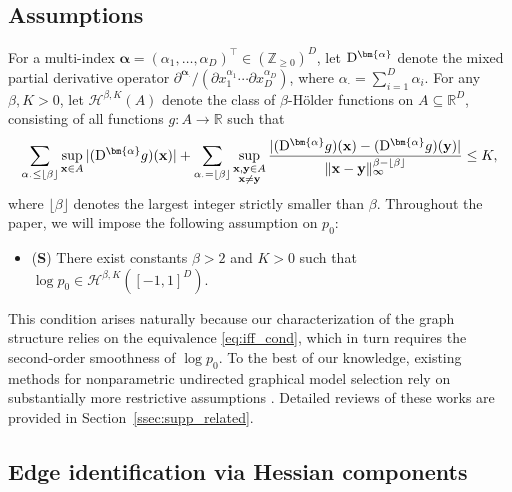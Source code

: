 \documentclass[11pt,a4paper,final]{article}
\numberwithin{equation}{section}
\theoremstyle{remark}
\def\cH{\mathcal H}
\newcommand{\bS}{{\bf S}}
\newcommand{\bx}{{\bf x}}
\newcommand{\by}{{\bf y}}
\newcommand{\bbR}{{\mathbb R}}
\newcommand{\bbZ}{{\mathbb Z}}
\newcommand{\balpha}{\bm{\alpha}}
\newcommand{\Holder}{H\"{o}lder}
\newcommand{\bean}{\setlength\arraycolsep{1pt}\begin{eqnarray*}}
\newcommand{\eean}{\end{eqnarray*}}
\newcommand{\bed}{\begin{itemize}}
\newcommand{\eed}{\end{itemize}}
\def\D{{\rm D}}
\begin{document}
\subsection{Assumptions}
\label{ssec:assm}

For a multi-index $\balpha = (\alpha_1,\ldots,\alpha_D)^{\top} \in (\bbZ_{\geq 0})^{D}$, let $\D^{\balpha}$ denote the mixed partial derivative operator $\partial^{\balpha_{\cdot}} / ( \partial x_1^{\alpha_1} \cdots \partial x_{D}^{\alpha_D})$, where $\alpha{_{\cdot}} = \sum_{i=1}^{D} \alpha_i$.
For any $\beta, K > 0$, let $\cH^{\beta, K}(A)$ denote the class of $\beta$-H\"older functions on $A \subseteq \bbR^{D}$, consisting of all functions $g : A \to \bbR$ such that
\bean
\sum_{\alpha_{\cdot} \leq \lfloor \beta \rfloor} \sup_{\bx \in A} \vert (\D^{\balpha} g) (\bx) \vert + \sum_{\alpha_{\cdot} = \lfloor \beta \rfloor} \sup_{\substack{\bx,\by \in A \\ \bx \neq \by}} \frac{\vert (\D^{\balpha} g)(\bx) - (\D^{\balpha} g)(\by) \vert}{\| \bx-\by\|_{\infty}^{\beta - \lfloor \beta \rfloor}} \leq K,
\eean
where $\lfloor \beta \rfloor$ denotes the largest integer strictly smaller than $\beta$.
Throughout the paper, we will impose the following assumption on  $p_{0}$:
\bed
\item[] (\bS) There exist constants $\beta > 2$ and $K > 0$ such that $\log p_0 \in \cH^{\beta, K}([-1,1]^{D})$.
\eed

This condition arises naturally because our characterization of the graph structure relies on the equivalence \eqref{eq:iff_cond}, which in turn requires the second-order smoothness of $\log p_{0}$.
To the best of our knowledge, existing methods for nonparametric undirected graphical model selection rely on substantially more restrictive assumptions \citep{liu2009nonparanormal,liu2012copula,xue2012regularized,liu2011forest,baptista2024learning,zheng2023generalized,liaw2025learning}.
Detailed reviews of these works are provided in Section~\ref{ssec:supp_related}.



\subsection{Edge identification via Hessian components}
\label{ssec:hessian}
\end{document}
